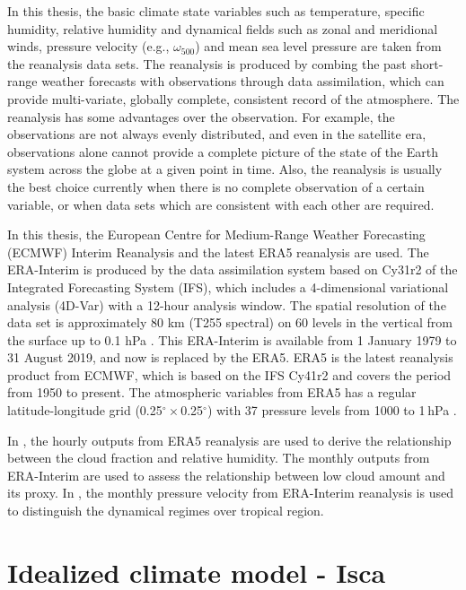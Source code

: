 In this thesis, the basic climate state variables such as temperature, specific humidity, relative humidity and dynamical fields such as zonal and meridional winds, pressure velocity (e.g., $\omega_{500}$) and mean sea level pressure are taken from the reanalysis data sets. The reanalysis is produced by combing the past short-range weather forecasts with observations through data assimilation, which can provide multi-variate, globally complete, consistent record of the atmosphere. The reanalysis has some advantages over the observation. For example, the observations are not always evenly distributed, and even in the satellite era, observations alone cannot provide a complete picture of the state of the Earth system across the globe at a given point in time. Also, the reanalysis is usually the best choice currently  when there is no complete observation of a certain variable, or when data sets which are consistent with each other are required.

In this thesis, the European Centre for Medium-Range Weather Forecasting (ECMWF) Interim Reanalysis \citep[ERA-Interim;][]{Dee2011} and the latest ERA5 \citep{era5} reanalysis are used. The ERA-Interim is produced by the data assimilation system based on Cy31r2 of the Integrated Forecasting System (IFS), which includes a 4-dimensional variational analysis (4D-Var) with a 12-hour analysis window. The spatial resolution of the data set is approximately 80 km (T255 spectral) on 60 levels in the vertical from the surface up to 0.1 hPa \citep{Dee2011}. This ERA-Interim is available from 1 January 1979 to 31 August 2019, and now is replaced by the ERA5. ERA5 is the latest reanalysis product from ECMWF, which is based on the IFS Cy41r2 and covers the period from 1950 to present. The atmospheric variables from ERA5 has a regular latitude-longitude grid (0.25$^\circ \times$0.25$^\circ$) with 37 pressure levels from 1000 to 1 hPa \citep{Hersbach2020era5}.

In , the hourly outputs from ERA5 reanalysis are used to derive the relationship between the cloud fraction and relative humidity. The monthly outputs from ERA-Interim are used to assess the relationship between low cloud amount and its proxy. In , the monthly pressure velocity from ERA-Interim reanalysis is used to distinguish the dynamical regimes over tropical region.

\section{Idealized climate model - Isca}
\label{sec:isca_intro}

